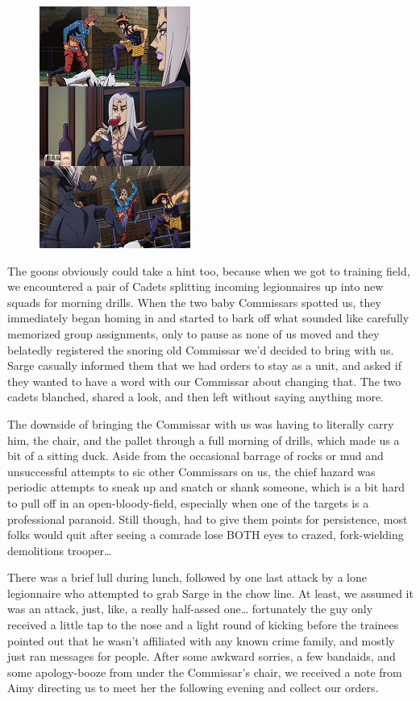 \begin{figure}
	\begin{center}
		\includegraphics[width=\figwidth]{pics/21/39.png}
	\end{center}
\end{figure}
The goons obviously could take a hint too, because when we got to training field, we encountered a pair of Cadets splitting incoming legionnaires up into new squads for morning drills. 
When the two baby Commissars spotted us, they immediately began homing in and started to bark off what sounded like carefully memorized group assignments, only to pause as none of us moved and they belatedly registered the snoring old Commissar we'd decided to bring with us. 
Sarge casually informed them that we had orders to stay as a unit, and asked if they wanted to have a word with our Commissar about changing that. 
The two cadets blanched, shared a look, and then left without saying anything more.

The downside of bringing the Commissar with us was having to literally carry him, the chair, and the pallet through a full morning of drills, which made us a bit of a sitting duck. 
Aside from the occasional barrage of rocks or mud and unsuccessful attempts to sic other Commissars on us, the chief hazard was periodic attempts to sneak up and snatch or shank someone, which is a bit hard to pull off in an open-bloody-field, especially when one of the targets is a professional paranoid. 
Still though, had to give them points for persistence, most folks would quit after seeing a comrade lose BOTH eyes to crazed, fork-wielding demolitions trooper…  

There was a brief lull during lunch, followed by one last attack by a lone legionnaire who attempted to grab Sarge in the chow line. 
At least, we assumed it was an attack, just, like, a really half-assed one… fortunately the guy only received a little tap to the nose and a light round of kicking before the trainees pointed out that he wasn't affiliated with any known crime family, and mostly just ran messages for people. 
After some awkward sorries, a few bandaids, and some apology-booze from under the Commissar's chair, we received a note from Aimy directing us to meet her the following evening and collect our orders.

